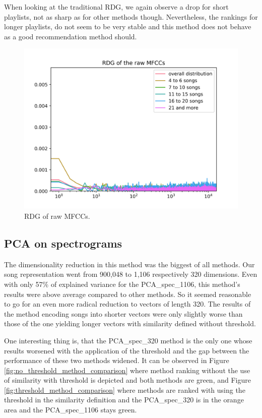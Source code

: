  When looking at the traditional RDG, we again observe a drop for short playlists, not as sharp as for other methods though. Nevertheless, the rankings for longer playlists, do not seem to be very stable and this method does not behave as a good recommendation method should.
 
\begin{figure}[H]
    \centering
	\includegraphics[width=120mm]{./img/mfcc_graph.png}
	\caption{RDG of raw MFCCs.}
	\label{fig:mfcc_graph}
\end{figure}

\subsection{PCA on spectrograms}\label{ssec:pca_spec_results}



The dimensionality reduction in this method was the biggest of all methods. Our song representation went from 900,048 to 1,106 respectively 320 dimensions.
Even with only 57\% of explained variance for the PCA\_spec\_1106, this method's results were above average compared to other methods. So it seemed reasonable to go for an even more radical reduction to vectors of length 320. The results of the method encoding songs into shorter vectors were only slightly worse than those of the one yielding longer vectors with similarity defined without threshold. 

One interesting thing is, that the PCA\_spec\_320 method is the only one whose results worsened with the application of the threshold and the gap between the performance of these two methods widened. It can be observed in Figure \ref{fig:no_threshold_method_comparison} where method ranking without the use of similarity with threshold is depicted and both methods are green, and Figure \ref{fig:threshold_method_comparison} where methods are ranked with using the threshold in the similarity definition and the PCA\_spec\_320 is in the orange area and the PCA\_spec\_1106 stays green.

